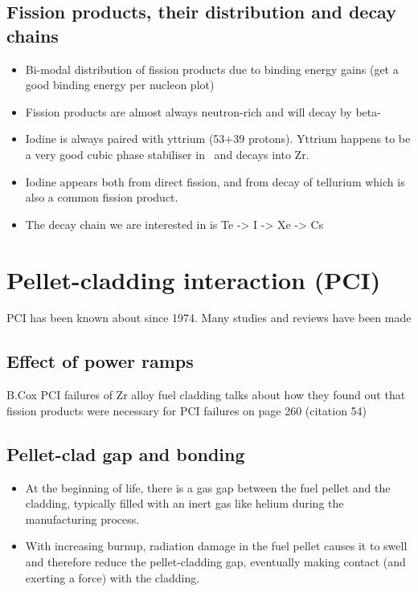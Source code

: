 \subsection{Fission products, their distribution and decay chains}

\begin{itemize}
\item Bi-modal distribution of fission products due to binding energy gains (get a good binding energy per nucleon plot)
\item Fission products are almost always neutron-rich and will decay by beta-
\item Iodine is always paired with yttrium (53+39 protons). Yttrium happens to be a very good cubic phase stabiliser in \zirconia\ and decays into Zr.
\item Iodine appears both from direct fission, and from decay of tellurium which is also a common fission product.
\item The decay chain we are interested in is Te -> I -> Xe -> Cs
\end{itemize}

\section{Pellet-cladding interaction (PCI)}

PCI has been known about since 1974. Many studies and reviews have been made \cite{alam2011review}

\subsection{Effect of power ramps}
B.Cox PCI failures of Zr alloy fuel cladding \cite{bcoxpelletclad1990} talks about how they found out that fission products were necessary for PCI failures on page 260 (citation 54)

\subsection{Pellet-clad gap and bonding}

\begin{itemize}
\item At the beginning of life, there is a gas gap between the fuel pellet and the cladding, typically filled with an inert gas like helium during the manufacturing process.
\item With increasing burnup, radiation damage in the fuel pellet causes it to swell and therefore reduce the pellet-cladding gap, eventually making contact (and exerting a force) with the cladding.
\end{itemize}

